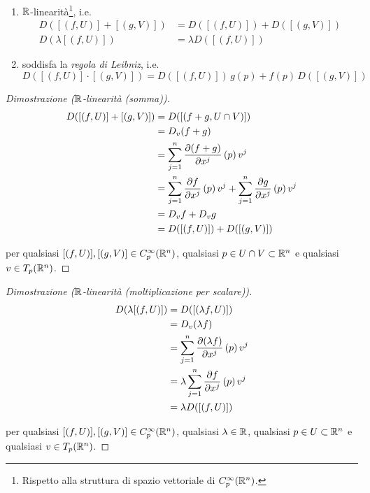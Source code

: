 \begin{enumerate}
	\item $ \mathbb{R} $-linearità\footnote{%
		Rispetto alla struttura di spazio vettoriale di $ C_{p}^{\infty}(\mathbb{R}^{n}) $.%
	}, i.e.
		\begin{align}
			D ([(f,U)] + [(g,V)]) &= D ([(f,U)]) + D ([(g,V)]) \\
			D (\lambda [(f,U)]) &= \lambda D ([(f,U)])
		\end{align}
	
	\item soddisfa la \textit{regola di Leibniz}, i.e.
		\begin{equation}
			D ([(f,U)] \cdot [(g,V)]) = D ([(f,U)]) \, g(p) + f(p) \, D ([(g,V)])
		\end{equation}
\end{enumerate}

\begin{proof}[Dimostrazione ($ \mathbb{R} $-linearità (somma))]
	\begin{align}
		\begin{split}
			D ([(f,U)] + [(g,V)]) &= D ([(f+g,U \cap V)]) \\
			&= D_{v} (f+g) \\
			&= \sum_{j=1}^{n} \pdv{(f+g)}{x^{j}} \, (p) \, v^{j} \\
			&= \sum_{j=1}^{n} \pdv{f}{x^{j}} \, (p) \, v^{j} + \sum_{j=1}^{n} \pdv{g}{x^{j}} \, (p) \, v^{j} \\
			&= D_{v} f + D_{v} g \\
			&= D ([(f,U)]) + D ([(g,V)])
		\end{split}
	\end{align}

	per qualsiasi $ [(f,U)], [(g,V)] \in C_{p}^{\infty}(\mathbb{R}^{n}) $, qualsiasi $ p \in U \cap V \subset \mathbb{R}^{n} $ e qualsiasi $ v \in T_{p} (\mathbb{R}^{n}) $.
\end{proof}

\begin{proof}[Dimostrazione ($ \mathbb{R} $-linearità (moltiplicazione per scalare))]
	\begin{align}
		\begin{split}
			D (\lambda [(f,U)]) &= D ([(\lambda f,U)]) \\
			&= D_{v} (\lambda f) \\
			&= \sum_{j=1}^{n} \pdv{(\lambda f)}{x^{j}} \, (p) \, v^{j} \\
			&= \lambda \sum_{j=1}^{n} \pdv{f}{x^{j}} \, (p) \, v^{j} \\
			&= \lambda D ([(f,U)])
		\end{split}
	\end{align}

	per qualsiasi $ [(f,U)], [(g,V)] \in C_{p}^{\infty}(\mathbb{R}^{n}) $, qualsiasi $ \lambda \in \mathbb{R} $, qualsiasi $ p \in U \subset \mathbb{R}^{n} $ e qualsiasi $ v \in T_{p} (\mathbb{R}^{n}) $.
\end{proof}

